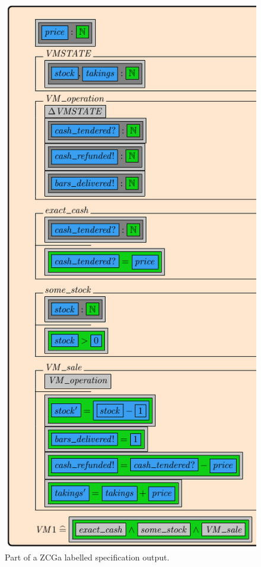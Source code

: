 \begin{figure}[H]
\begin{minipage}{0.45\textwidth}
\includegraphics[scale=0.4]{Figures/fullexample/zcga.png}
\vspace{-0.2in}
\caption{Part of a ZCGa labelled specification output. \label{fig:zcgaschemaout}}
\end{minipage}
\end{figure}

